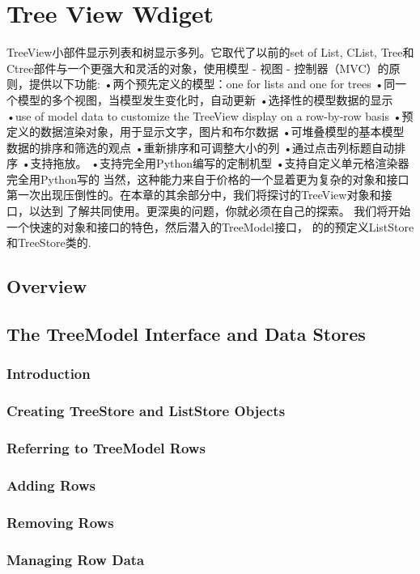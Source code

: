 \chapter{Tree View Wdiget}
TreeView小部件显示列表和树显示多列。它取代了以前的set of List, CList,
Tree和Ctree部件与一个更强大和灵活的对象，使用模型 - 视图 - 
控制器（MVC）的原则，提供以下功能:
•两个预先定义的模型：one for lists and one for trees
•同一个模型的多个视图，当模型发生变化时，自动更新
•选择性的模型数据的显示
•use of model data to customize the TreeView display on a row-by-row basis
•预定义的数据渲染对象，用于显示文字，图片和布尔数据
•可堆叠模型的基本模型数据的排序和筛选的观点
•重新排序和可调整大小的列
•通过点击列标题自动排序
•支持拖放。
•支持完全用Python编写的定制机型
•支持自定义单元格渲染器完全用Python写的
当然，这种能力来自于价格的一个显着更为复杂的对象和接口
第一次出现压倒性的。在本章的其余部分中，我们将探讨的TreeView对象和接口，以达到
了解共同使用。更深奥的问题，你就必须在自己的探索。
我们将开始一个快速的对象和接口的特色，然后潜入的TreeModel接口，
的的预定义ListStore和TreeStore类的.
\section{Overview}
\section{The TreeModel Interface and Data Stores}
	\subsection{Introduction}
	\subsection{Creating TreeStore and ListStore Objects}
	\subsection{Referring to TreeModel Rows}
	\subsection{Adding Rows}
	\subsection{Removing Rows}
	\subsection{Managing Row Data}
